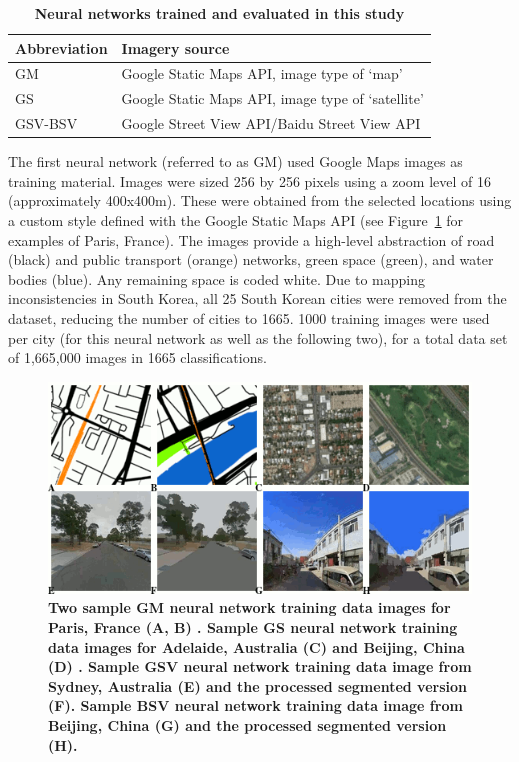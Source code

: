 \documentclass[urbansci,article,submit,moreauthors,pdftex]{Definitions/mdpi}
\begin{document}
\begin{table}[!htbp]
\caption{\bf Neural networks trained and evaluated in this study \label{tab:neuralnetworks}}     
\begin{tabular}{ l l }
 \hline Abbreviation   &  Imagery source \\ \hline
GM & Google Static Maps API, image type of `map'     \\ 
GS & Google Static Maps API, image type of `satellite'      \\
GSV-BSV & Google Street View API/Baidu Street View API     \\ \hline

\end{tabular}
\end{table}

The first neural network (referred to as GM) used Google Maps images as training material. Images were sized 256 by 256 pixels using a zoom level of 16 (approximately 400x400m). These were obtained from the selected locations using a custom style defined with the Google Static Maps API \citep{GoogleStatic2017} (see Figure~\ref{fig:maps} for examples of Paris, France). The images provide a high-level abstraction of road (black) and public transport (orange) networks, green space (green), and water bodies (blue). Any remaining space is coded white. Due to mapping inconsistencies in South Korea, all 25 South Korean cities were removed from the dataset, reducing the number of cities to 1665. 1000 training images were used per city (for this neural network as well as the following two), for a total data set of 1,665,000 images in 1665 classifications. 

\begin{figure}[!htbp]
    \centering    
\includegraphics[scale=0.5]{Figure2Maps_2.png}  
\caption{\bf Two sample GM neural network training data images for Paris, France (A, B) \citep{GoogleStatic2017}. Sample GS neural network training data images for Adelaide, Australia (C) and Beijing, China (D) \citep{GoogleStatic2017}. Sample GSV neural network training data image from Sydney, Australia (E) \citep{GoogleMaps2017b} and the processed segmented version (F). Sample BSV neural network training data image from Beijing, China (G) \citep{Baidu2017} and the processed segmented version (H).}    
 \label{fig:maps}  
\end{figure} 
\end{document}
